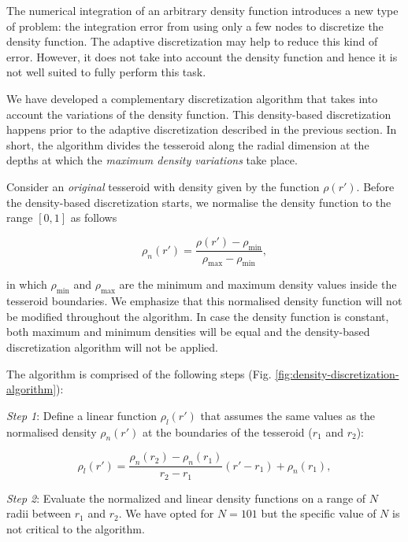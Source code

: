 \documentclass[extra, referee]{gji}
\begin{document}
The numerical integration of an arbitrary density function introduces
a new type of problem:
the integration error from using only a few nodes to discretize the density function.
The adaptive discretization may help
to reduce this kind of error.
However, it does not take into account the density function
and hence it is not well suited to fully perform this task.

We have developed a complementary discretization
algorithm that takes into account the variations of the density function.
This density-based discretization happens prior to the adaptive discretization described
in the previous section.
In short, the algorithm divides the tesseroid along the radial dimension at the
depths at which the \emph{maximum density variations} take place.

Consider an \emph{original} tesseroid with density given by the function $\rho(r')$.
Before the density-based discretization starts,
we normalise the density function to the range $[0, 1]$ as follows

\begin{equation}
    \rho_n(r') =
    \frac{\rho(r') - \rho_\text{min}}{\rho_\text{max} - \rho_\text{min}},
\end{equation}

\noindent in which $\rho_\text{min}$ and $\rho_\text{max}$ are the minimum and maximum
density values inside the tesseroid boundaries.
We emphasize that this normalised density function will not be modified throughout the
algorithm.
In case the density function is constant, both maximum and minimum densities will be
equal and the density-based discretization algorithm will not be applied.

The algorithm is comprised of the following steps
(Fig. \ref{fig:density-discretization-algorithm}):

\textit{Step 1}:
Define a linear function $\rho_l(r')$ that assumes
the same values as the normalised density $\rho_n(r')$ at the boundaries of the
tesseroid ($r_1$ and $r_2$):

\begin{equation}
    \rho_l(r') =
    \frac{ \rho_n(r_2) - \rho_n(r_1) }{ r_2 - r_1 } (r' - r_1) + \rho_n(r_1),
    \label{eq:density-reference-line}
\end{equation}

\textit{Step 2}:
Evaluate the normalized and linear density functions on a range of $N$ radii between
$r_1$ and $r_2$.
We have opted for $N = 101$ but the specific value of $N$ is not critical to the
algorithm.
\end{document}
